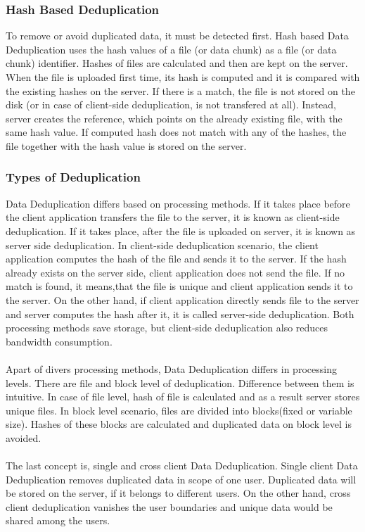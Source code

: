 \documentclass[12pt]{article}
\begin{document}
\subsubsection{Hash Based Deduplication}
\label{subsub:HashBased}
To remove or avoid duplicated data, it must be detected first. Hash based Data Deduplication uses the hash values of a file (or data chunk) as a file (or data chunk) identifier. Hashes of files are calculated and then are kept on the server. When the file is uploaded first time, its hash is computed and it is compared with the existing hashes on the server. If there is a match, the file is not stored on the disk (or in case of client-side deduplication, is not transfered at all). Instead, server creates the reference, which points on the already existing file, with the same hash value. If computed hash does not match with any of the hashes, the file together with the hash value is stored on the server.\cite{DeDupOverView}

\subsubsection{Types of Deduplication}
\label{subsub:TypesOfDedup}
Data Deduplication differs based on processing methods. If it takes place before the client application transfers the file to the server, it is known as client-side deduplication. If it takes place, after the file is uploaded on server, it is known as server side deduplication. In client-side deduplication scenario, the client application computes the hash of the file and sends it to the server. If the hash already exists on the server side, client application does not send the file. If no match is found, it means,that the file is unique and client application sends it to the server. On the other hand, if client application directly sends file to the server and server computes the hash after it, it is called server-side deduplication. Both processing methods save storage, but client-side deduplication also reduces bandwidth consumption.\cite{DeDupMethods}\\\\
Apart of divers processing methods, Data Deduplication differs in processing levels. There are file  and block level of deduplication. Difference between them is intuitive. In case of file level, hash of file is calculated and as a result server stores unique files. In block level scenario, files are divided into blocks(fixed or variable size). Hashes of these blocks are calculated and duplicated data on block level is avoided. \cite{DeDupMethods}\\\\
The last concept is, single and cross client Data Deduplication. Single client Data Deduplication removes duplicated data  in scope of one user. Duplicated data will be stored on the server, if it belongs to different users. On the other hand, cross client deduplication vanishes the user boundaries and unique data would be shared among the users.\cite{DeDupMethods}
\end{document}
